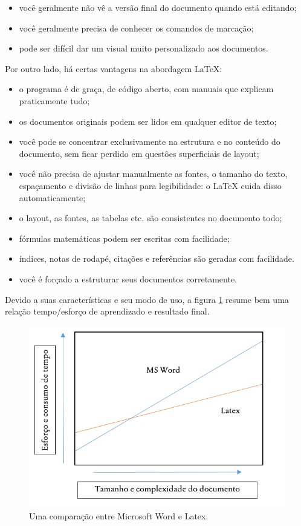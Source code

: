 \documentclass[a4paper,nols,bidi,nohyper,nobib]{tufte-book}
\begin{document}
\begin{itemize}

\item você geralmente não vê a versão final do documento quando está editando;
\item você geralmente precisa de conhecer os comandos de marcação;
\item pode ser difícil dar um visual muito personalizado aos documentos.
\end{itemize}

Por outro lado, há certas vantagens na abordagem \LaTeX:
\begin{itemize}
\item o programa é de graça, de código aberto, com manuais que explicam praticamente tudo;
\item os documentos originais podem ser lidos em qualquer editor de texto;
\item você pode se concentrar exclusivamente na estrutura e no conteúdo do documento, sem ficar perdido em questões superficiais de layout;
\item você não precisa de ajustar manualmente as fontes, o tamanho do texto, espaçamento e divisão de linhas para legibilidade: o \LaTeX{} cuida disso automaticamente;
\item o layout, as fontes, as tabelas etc. são consistentes no documento todo;
\item fórmulas matemáticas podem ser escritas com facilidade;
\item índices, notas de rodapé, citações e referências são geradas com facilidade.
\item você é forçado a estruturar seus documentos corretamente.
\end{itemize}

Devido a suas características e seu modo de uso, a figura \ref{fig:grafico-latex} resume bem uma relação tempo/esforço de aprendizado e resultado final.

\begin{figure}
\centering
\includegraphics[width=0.5\linewidth]{grafico-latex}
\caption{Uma comparação entre Microsoft Word e Latex.}
\label{fig:grafico-latex}
\end{figure}
\end{document}
